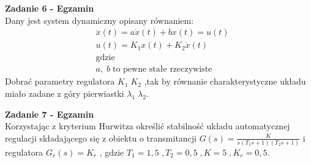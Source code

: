 \documentclass[a4paper,11pt]{article}
\begin{document}
\begin{framed}
\textbf{Zadanie 6 - Egzamin} \\ 
Dany jest system dynamiczny opisany równaniem:
\begin{align*}
&\ddot{x}(t)=a\dot{x}(t)+bx(t)=u(t) \\
&u(t)=K_1x(t)+K_2\dot{x}(t) \\
& \text{gdzie} \\
& a, \; b \; \text{to pewne stałe rzeczywiste}
\end{align*}
Dobrać parametry regulatora \( K_1 \; K_2 \) ,tak by równanie charakterystyczne układu miało zadane z góry pierwiastki \( \lambda _1 \; \lambda _2 \). 
\end{framed}


\begin{framed}
\textbf{Zadanie 7 - Egzamin} \\ 
Korzystając z kryterium Hurwitza określić stabilność układu automatycznej regulacji składającego się z obiektu o transmitancji \( G(s) = \frac{K}{s(T_1s+1)(T_2s+1)} \) i regulatora \( G_r(s) = K_r \) , gdzie \( T_1 = 1,5 \; , T_2=0,5 \; , K =5 \; , K_r = 0,5 \).  
\begin{figure}[H]
\begin{center}
\end{center}
\end{figure}
\end{framed}



\newpage
\end{document}
